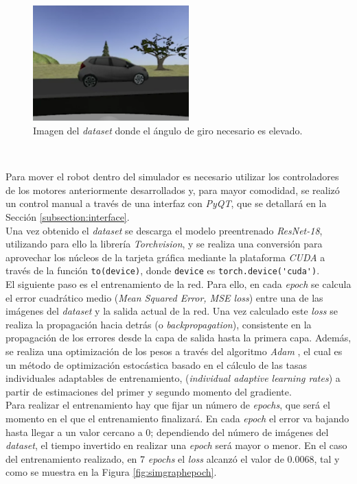 \begin{figure} [h!]
	\begin{center}
		\includegraphics[width=6cm]{figs/trainedDifficult}
	\end{center}
	\caption{Imagen del \textit{dataset} donde el ángulo de giro necesario es elevado.}
	\label{fig:traineddifficult}
\end{figure}\

Para mover el robot dentro del simulador es necesario utilizar los controladores de los motores anteriormente desarrollados y, para mayor comodidad, se realizó un control manual a través de una interfaz con \textit{PyQT}, que se detallará en la Sección \ref{subsection:interface}.\\

Una vez obtenido el \textit{dataset} se descarga el modelo preentrenado \textit{ResNet-18}, utilizando para ello la librería \textit{Torchvision}, y se realiza una conversión para aprovechar los núcleos de la tarjeta gráfica mediante la plataforma \textit{CUDA} a través de la función \verb|to(device)|, donde \verb|device| es \verb|torch.device('cuda')|.\\

El siguiente paso es el entrenamiento de la red. Para ello, en cada \textit{epoch} se calcula el error cuadrático medio (\textit{Mean Squared Error, MSE loss}) entre una de las imágenes del \textit{dataset} y la salida actual de la red. Una vez calculado este \textit{loss} se realiza la propagación hacia detrás (o \textit{backpropagation}), consistente en la propagación de los errores desde la capa de salida hasta la primera capa. Además, se realiza una optimización de los pesos a través del algoritmo \textit{Adam} \cite{adam}, el cual es un método de optimización estocástica basado en el cálculo de las tasas individuales adaptables de entrenamiento, (\textit{individual adaptive learning rates}) a partir de estimaciones del primer y segundo momento del gradiente.\\

Para realizar el entrenamiento hay que fijar un número de \textit{epochs}, que será el momento en el que el entrenamiento finalizará. En cada \textit{epoch} el error va bajando hasta llegar a un valor cercano a 0; dependiendo del número de imágenes del \textit{dataset}, el tiempo invertido en realizar una \textit{epoch} será mayor o menor. En el caso del entrenamiento realizado, en 7 \textit{epochs} el \textit{loss} alcanzó el valor de 0.0068, tal y como se muestra en la Figura \ref{fig:simgraphepoch}.\\

